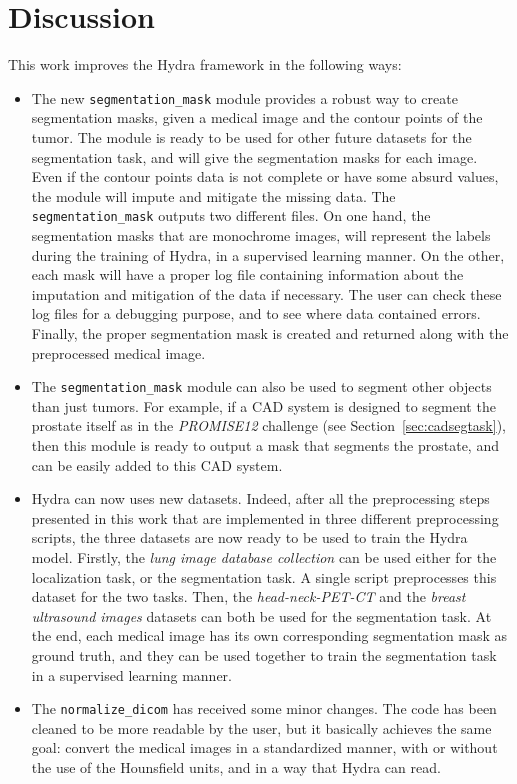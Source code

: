 \section{Discussion}
This work improves the Hydra framework in the following ways:
\begin{itemize}
  \item The new \texttt{segmentation\_mask} module provides a robust way to create segmentation masks, given a medical image and the contour points of the tumor. The module is ready to be used for other future datasets for the segmentation task, and will give the segmentation masks for each image. Even if the contour points data is not complete or have some absurd values, the module will impute and mitigate the missing data. The \texttt{segmentation\_mask} outputs two different files. On one hand, the segmentation masks that are monochrome images, will represent the labels during the training of Hydra, in a supervised learning manner. On the other, each mask will have a proper log file containing information about the imputation and mitigation of the data if necessary. The user can check these log files for a debugging purpose, and to see where data contained errors. Finally, the proper segmentation mask is created and returned along with the preprocessed medical image.
  \item The \texttt{segmentation\_mask} module can also be used to segment other objects than just tumors. For example, if a CAD system is designed to segment the prostate itself as in the \emph{PROMISE12} challenge (see Section~\ref{sec:cadsegtask}), then this module is ready to output a mask that segments the prostate, and can be easily added to this CAD system.
  \item Hydra can now uses new datasets. Indeed, after all the preprocessing steps presented in this work that are implemented in three different preprocessing scripts, the three datasets are now ready to be used to train the Hydra model. Firstly, the \emph{lung image database collection} can be used either for the localization task, or the segmentation task. A single script preprocesses this dataset for the two tasks. Then, the \emph{head-neck-PET-CT} and the \emph{breast ultrasound images} datasets can both be used for the segmentation task. At the end, each medical image has its own corresponding segmentation mask as ground truth, and they can be used together to train the segmentation task in a supervised learning manner.
  \item The \texttt{normalize\_dicom} has received some minor changes. The code has been cleaned to be more readable by the user, but it basically achieves the same goal: convert the medical images in a standardized manner, with or without the use of the Hounsfield units, and in a way that Hydra can read.
\end{itemize}
